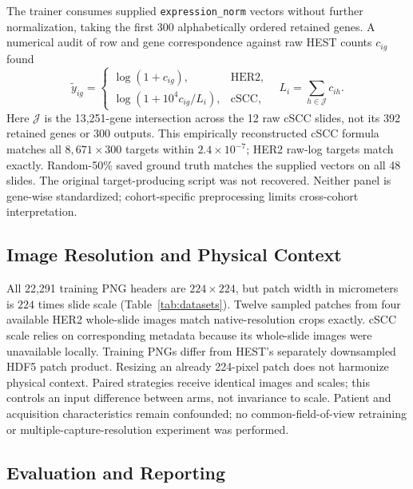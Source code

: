 \documentclass[]{spie}
\begin{document}
The trainer consumes supplied \texttt{expression\_norm} vectors without further normalization, taking the first 300 alphabetically ordered retained genes. A numerical audit of row and gene correspondence against raw HEST counts $c_{ig}$ found
\begin{equation}
\tilde y_{ig}=\begin{cases}
\log(1+c_{ig}), &\text{HER2},\\
\log(1+10^4c_{ig}/L_i), &\text{cSCC},
\end{cases}
\quad L_i=\sum_{h\in\mathcal J}c_{ih}.
\label{eq:targets}
\end{equation}
Here $\mathcal J$ is the 13,251-gene intersection across the 12 raw cSCC slides, not its 392 retained genes or 300 outputs. This empirically reconstructed cSCC formula matches all $8{,}671\times300$ targets within $2.4\times10^{-7}$; HER2 raw-log targets match exactly. Random-50\% saved ground truth matches the supplied vectors on all 48 slides. The original target-producing script was not recovered. Neither panel is gene-wise standardized; cohort-specific preprocessing limits cross-cohort interpretation.

\subsection{Image Resolution and Physical Context}
\label{sec:resolution}

All 22,291 training PNG headers are $224\times224$, but patch width in micrometers is $224$ times slide scale (Table~\ref{tab:datasets}). Twelve sampled patches from four available HER2 whole-slide images match native-resolution crops exactly. cSCC scale relies on corresponding metadata because its whole-slide images were unavailable locally. Training PNGs differ from HEST's separately downsampled HDF5 patch product. Resizing an already 224-pixel patch does not harmonize physical context. Paired strategies receive identical images and scales; this controls an input difference between arms, not invariance to scale. Patient and acquisition characteristics remain confounded; no common-field-of-view retraining or multiple-capture-resolution experiment was performed.

\subsection{Evaluation and Reporting}
\label{sec:evaluation}
\end{document}
